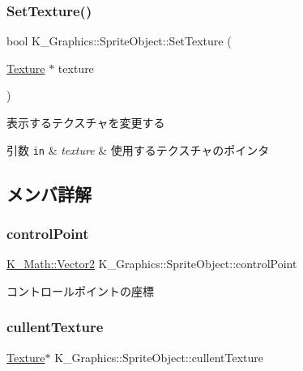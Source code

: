 \subsubsection{\texorpdfstring{Set\+Texture()}{SetTexture()}}
{\footnotesize\ttfamily bool K\+\_\+\+Graphics\+::\+Sprite\+Object\+::\+Set\+Texture (\begin{DoxyParamCaption}\item[{\mbox{\hyperlink{class_k___graphics_1_1_texture}{Texture}} $\ast$}]{texture }\end{DoxyParamCaption})}



表示するテクスチャを変更する 


\begin{DoxyParams}[1]{引数}
\mbox{\tt in}  & {\em texture} & 使用するテクスチャのポインタ \\
\hline
\end{DoxyParams}


\subsection{メンバ詳解}
\mbox{\label{class_k___graphics_1_1_sprite_object_ad5d76b9b0a30102d01abbb20bab285f8}} 
\subsubsection{\texorpdfstring{control\+Point}{controlPoint}}
{\footnotesize\ttfamily \mbox{\hyperlink{namespace_k___math_a41eb0c2c69c938cd59989eb3241cefb2}{K\+\_\+\+Math\+::\+Vector2}} K\+\_\+\+Graphics\+::\+Sprite\+Object\+::control\+Point}



コントロールポイントの座標 

\mbox{\label{class_k___graphics_1_1_sprite_object_a7cf528d065c242528bf0bd407a139f09}} 
\subsubsection{\texorpdfstring{cullent\+Texture}{cullentTexture}}
{\footnotesize\ttfamily \mbox{\hyperlink{class_k___graphics_1_1_texture}{Texture}}$\ast$ K\+\_\+\+Graphics\+::\+Sprite\+Object\+::cullent\+Texture\hspace{0.3cm}{\ttfamily [protected]}}

